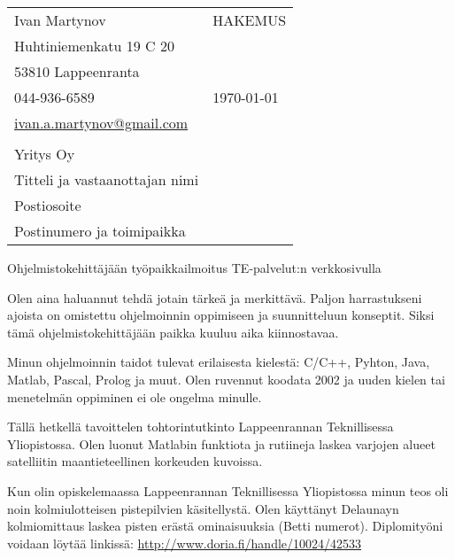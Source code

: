 \documentclass[]{article}
\begin{document}
\begin{table}[h]
  \begin{tabular}{p{} p{}}
    Ivan Martynov & HAKEMUS\\
    Huhtiniemenkatu 19 C 20 & \\
    53810 Lappeenranta & \\
    044-936-6589 & \today\\
    \href{ivan.a.martynov@gmail.com}{ivan.a.martynov@gmail.com} &\\
    &\\
    Yritys Oy & \\
    Titteli ja vastaanottajan nimi & \\
    Postiosoite & \\
    Postinumero ja toimipaikka &
  \end{tabular}
\end{table}

\begin{center}
  Ohjelmistokehitt\"aj\"a\"an ty\"opaikkailmoitus TE-palvelut:n verkkosivulla
\end{center}

\noindent
Olen aina haluannut tehd\"a jotain t\"arke\"a ja merkitt\"av\"a. Paljon
harrastukseni ajoista on omistettu ohjelmoinnin oppimiseen ja suunnitteluun
konseptit. Siksi t\"am\"a ohjelmistokehitt\"aj\"a\"an paikka kuuluu aika
kiinnostavaa.
\medskip

\noindent
Minun ohjelmoinnin taidot tulevat erilaisesta kielest\"a: C/C++, Pyhton,
Java, Matlab, Pascal, Prolog ja muut. Olen ruvennut koodata 2002 ja uuden
kielen tai menetelm\"an oppiminen ei ole ongelma minulle.
\medskip

\noindent
T\"all\"a hetkell\"a tavoittelen tohtorintutkinto Lappeenrannan Teknillisessa
Yliopistossa. Olen luonut Matlabin funktiota ja rutiineja laskea varjojen alueet
satelliitin maantieteellinen korkeuden kuvoissa.
\medskip

\noindent
Kun olin opiskelemaassa Lappeenrannan Teknillisessa Yliopistossa minun teos oli
noin kolmiulotteisen pistepilvien k\"asitellyst\"a. Olen k\"aytt\"anyt Delaunayn
kolmiomittaus laskea pisten er\"ast\"a ominaisuuksia (Betti numerot).
Diplomity\"oni voidaan l\"oyt\"a\"a linkiss\"a:
\href{http://www.doria.fi/handle/10024/42533}
{http://www.doria.fi/handle/10024/42533}
\medskip
\end{document}
